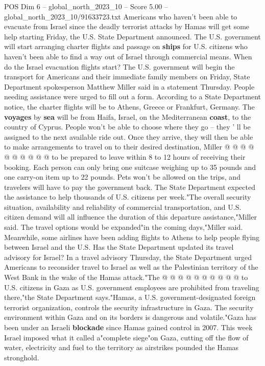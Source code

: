 \begin{textsample}{POS Dim 6 – global\_north\_2023\_10 – Score 5.00 – global\_north\_2023\_10/91633723.txt}  \label{ex:f6_pos_241}
Americans who haven't been able to evacuate from Israel since the deadly terrorist attacks by Hamas will get some help starting Friday, the U.S.
State Department announced.
The U.S. government will start arranging charter flights and passage on \textbf{ships} for U.S. citizens who haven't been able to find a way out of Israel through commercial means.
When do the Israel evacuation flights start?
The U.S. government will begin the transport for Americans and their immediate family members on Friday, State Department spokesperson Matthew Miller said in a statement Thursday.
People needing assistance were urged to fill out a form.
According to a State Department notice, the charter flights will be to Athens, Greece or Frankfurt, Germany.
The \textbf{voyages} by \textbf{sea} will be from Haifa, Israel, on the Mediterranean \textbf{coast}, to the country of Cyprus.
People won't be able to choose where they go -- they ' ll be assigned to the next available ride out.
Once they arrive, they will then be able to make arrangements to travel on to their desired destination, Miller @ @ @ @ @ @ @ @ @ @ to be prepared to leave within 8 to 12 hours of receiving their booking.
Each person can only bring one suitcase weighing up to 35 pounds and one carry-on item up to 22 pounds.
Pets won't be allowed on the trips, and travelers will have to pay the government back.
The State Department expected the assistance to help thousands of U.S. citizens per week."The overall security situation, availability and reliability of commercial transportation, and U.S. citizen demand will all influence the duration of this departure assistance,"Miller said.
The travel options would be expanded"in the coming days,"Miller said.
Meanwhile, some airlines have been adding flights to Athens to help people flying between Israel and the U.S.
Has the State Department updated its travel advisory for Israel?
In a travel advisory Thursday, the State Department urged Americans to reconsider travel to Israel as well as the Palestinian territory of the West Bank in the wake of the Hamas attack."The @ @ @ @ @ @ @ @ @ @ to U.S. citizens in Gaza as U.S. government employees are prohibited from traveling there,"the State Department says."Hamas, a U.S. government-designated foreign terrorist organization, controls the security infrastructure in Gaza.
The security environment within Gaza and on its borders is dangerous and volatile."Gaza has been under an Israeli \textbf{blockade} since Hamas gained control in 2007.
This week Israel imposed what it called a"complete siege"on Gaza, cutting off the flow of water, electricity and fuel to the territory as airstrikes pounded the Hamas stronghold.

\end{textsample}
